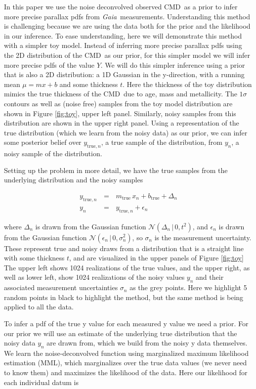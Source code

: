 \documentclass[modern]{aastex61}
\newcommand{\acronym}[1]{{\small{#1}}}
\newcommand{\project}[1]{\textsl{#1}}
\newcommand{\gaia}{\project{Gaia}}
\newcommand{\cmd}{\acronym{CMD}}
\newcommand{\given}{\,|\,}
\newcommand{\true}{\mathrm{true}}
\begin{document}
In this paper we use the noise deconvolved observed \cmd\ as a prior to infer more precise parallax pdfs from \gaia\ measurements.
Understanding this method is challenging because we are using the data both for the prior and the likelihood in our inference.
To ease understanding, here we will demonstrate this method with a simpler toy model.
Instead of inferring more precise parallax pdfs using the 2D distribution of the \cmd\ as our prior, for this simpler model we will infer more precise pdfs of the value $Y$.
We will do this simpler inference using a prior that is also a 2D distribution: a 1D Gaussian in the y-direction, with a running mean $\mu = mx + b$ and some thickness $t$.
Here the thickness of the toy distribution mimics the true thickness of the \cmd\ due to age, mass and metallicity.
The $1\sigma$ contours as well as (noise free) samples from the toy model distribution are shown in Figure \ref{fig:toy}, upper left panel.
Similarly, noisy samples from this distribution are shown in the upper right panel.
Using a representation of the true distribution (which we learn from the noisy data) as our prior, we can infer some posterior belief over $y_{\true,n}$, a true sample of the distribution, from $y_n$, a noisy sample of the distribution.

Setting up the problem in more detail, we have the true samples from the underlying distribution and the noisy samples

\begin{eqnarray}
y_{\true, n} \, &=& \, m_{\true}\,x_n + b_{\true} + \Delta_n \\
y_n \, &=& \, y_{\true,n} + \epsilon_n
\label{eq:ytrue}
\end{eqnarray}

where $\Delta_n$ is drawn from the Gaussian function $\mathcal{N}(\Delta_n \given 0, t^2)$, and $\epsilon_n$ is drawn from the Gaussian function $\mathcal{N}(\epsilon_n \given 0, \sigma_n^2)$, so $\sigma_n$ is the measurement uncertainty.
These represent true and noisy draws from a distribution that is a straight line with some thickness $t$, and are visualized in the upper panels of Figure \ref{fig:toy}
The upper left shows 1024 realizations of the true values, and the upper right, as well as lower left, show 1024 realizations of the noisy values $y_n$ and their associated measurement uncertainties $\sigma_n$ as the grey points. Here we highlight 5 random points in black to highlight the method, but the same method is being applied to all the data.

To infer a pdf of the true y value for each measured y value we need a prior. For our prior we will use an estimate of the underlying true distribution that the noisy data $y_n$ are drawn from, which we build from the noisy y data themselves.
We learn the noise-deconvolved function using marginalized maximum likelihood estimation (MML), which marginalizes over the true data values (we never need to know them) and maximizes the likelihood of the data. Here our likelihood for each individual datum is
\end{document}
